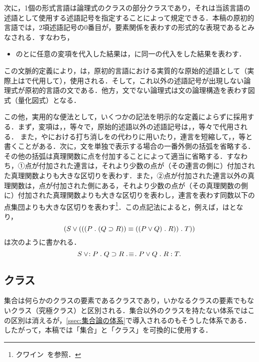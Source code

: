 次に，1個の形式言語は論理式のクラスの部分クラスであり，それは当該言語の述語として使用する述語記号を指定することによって規定できる．本稿の原初的言語では，$2$項述語記号の$0$番目が，要素関係を表わす\kagi{$ \in $}の形式的な表現であるとみなされる．すなわち，
\begin{itemize}
    \item \kagi{$(\alpha\in\beta)$}の\kagi{$\alpha$}と\kagi{$\beta$}に任意の変項を代入した結果は，に同一の代入をした結果を表わす．
\end{itemize}
この文脈的定義により，は，原初的言語における実質的な原始的述語として（実際上は\kagi{$ \in $}で代用して），使用される．そして，これ以外の述語記号が出現しない論理式が原初的言語の文である．他方，文でない論理式は文の論理構造を表わす図式（量化図式）となる．

この他，実用的な便法として，いくつかの記法を明示的な定義によらずに採用する．まず，変項は，，等々で，原始的述語以外の述語記号は，，等々で代用される．
また，\kagi{$\notin$}や\kagi{$\neq$}における打ち消しを\kagi{$\neg$}の代わりに用いたり，連言を短縮して，，等と書くことがある．次に，文を単独で表示する場合の一番外側の括弧を省略する．その他の括弧は真理関数に点を付加することによって適当に省略する．すなわち，①点が付加された連言は，それより少数の点が（その連言の側に）付加された真理関数よりも大きな区切りを表わす．また，②点が付加された連言以外の真理関数は，点が付加された側にある，それより少数の点が（その真理関数の側に）付加された真理関数よりも大きな区切りを表わし，連言を表わす同数以下の点集団よりも大きな区切りを表わす\footnote{
    クワイン~\cite[pp.\,26--28]{クワインb}を参照．
}．この点記法によると，例えば，はとなり，
\[
    (S\lor(((P\con{1}(Q\supset R))\equiv((P\lor Q)\con{1}R))\con{1}T))
\]
は次のように書かれる．
\[
    S\case{2}{0}{2}P\con{1}Q\supset R\case{3}{1}{1}P\lor Q\con{1}R\con{2}T.
\]

\subsection{クラス}
\label{ssec:クラス}

集合は何らかのクラスの要素であるクラスであり，いかなるクラスの要素でもないクラス（究極クラス）と区別される．集合以外のクラスを持たない体系ではこの区別は消えるが，\ref{ssec:集合論の体系}で導入されるのもそうした体系である．したがって，本稿では「集合」と「クラス」を可換的に使用する．

